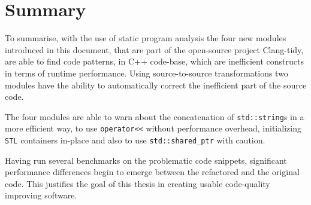 \section{Summary}
\par To summarise, with the use of static program analysis the four new modules introduced in this document, that are part of the open-source project Clang-tidy, are able to find code patterns, in C++ code-base, which are inefficient constructs in terms of runtime performance. Using source-to-source transformations two modules have the ability to automatically correct the inefficient part of the source code. \medskip
\par The four modules are able to warn about the concatenation of \verb|std::string|s in a more efficient way, to use \verb|operator<<| without performance overhead, initializing \verb|STL| containers in-place and also to use \verb|std::shared_ptr| with caution. \medskip
\par Having run several benchmarks on the problematic code snippets, significant performance differences begin to emerge between the refactored and the original code. This justifies the goal of this thesis in creating usable code-quality improving software. 